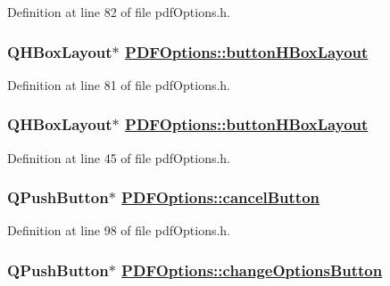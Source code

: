 Definition at line 82 of file pdf\-Options.h.\hypertarget{classPDFOptions_r40}{
\subsubsection[buttonHBoxLayout]{\setlength{\rightskip}{0pt plus 5cm}QHBox\-Layout$\ast$ \hyperlink{classPDFOptions_r10}{PDFOptions::button\-HBox\-Layout}}}
\label{classPDFOptions_r40}


Definition at line 81 of file pdf\-Options.h.\hypertarget{classPDFOptions_r10}{
\subsubsection[buttonHBoxLayout]{\setlength{\rightskip}{0pt plus 5cm}QHBox\-Layout$\ast$ \hyperlink{classPDFOptions_r10}{PDFOptions::button\-HBox\-Layout}}}
\label{classPDFOptions_r10}


Definition at line 45 of file pdf\-Options.h.\hypertarget{classPDFOptions_r55}{
\subsubsection[cancelButton]{\setlength{\rightskip}{0pt plus 5cm}QPush\-Button$\ast$ \hyperlink{classPDFOptions_r55}{PDFOptions::cancel\-Button}}}
\label{classPDFOptions_r55}


Definition at line 98 of file pdf\-Options.h.\hypertarget{classPDFOptions_r11}{
\subsubsection[changeOptionsButton]{\setlength{\rightskip}{0pt plus 5cm}QPush\-Button$\ast$ \hyperlink{classPDFOptions_r11}{PDFOptions::change\-Options\-Button}}}
\label{classPDFOptions_r11}


